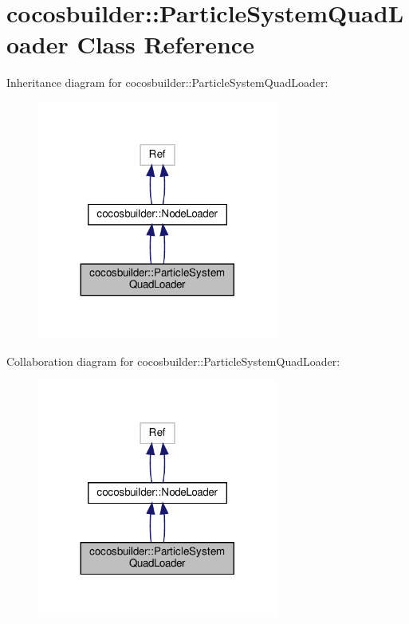 \hypertarget{classcocosbuilder_1_1ParticleSystemQuadLoader}{}\section{cocosbuilder\+:\+:Particle\+System\+Quad\+Loader Class Reference}
\label{classcocosbuilder_1_1ParticleSystemQuadLoader}


Inheritance diagram for cocosbuilder\+:\+:Particle\+System\+Quad\+Loader\+:
\nopagebreak
\begin{figure}[H]
\begin{center}
\leavevmode
\includegraphics[width=224pt]{classcocosbuilder_1_1ParticleSystemQuadLoader__inherit__graph}
\end{center}
\end{figure}


Collaboration diagram for cocosbuilder\+:\+:Particle\+System\+Quad\+Loader\+:
\nopagebreak
\begin{figure}[H]
\begin{center}
\leavevmode
\includegraphics[width=224pt]{classcocosbuilder_1_1ParticleSystemQuadLoader__coll__graph}
\end{center}
\end{figure}
